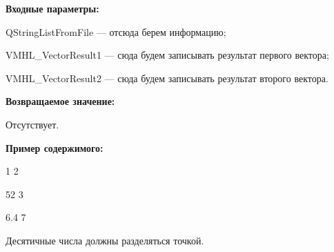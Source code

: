 \textbf{Входные параметры:}
 
QStringListFromFile --- отсюда берем информацию;
 
    VMHL\_VectorResult1 --- сюда будем записывать результат первого вектора;
 
    VMHL\_VectorResult2 --- сюда будем записывать результат второго вектора.

\textbf{Возвращаемое значение:}

Отсутствует.

\textbf{Пример содержимого:}

1	2

52	3

6.4	7

Десятичные числа должны разделяться точкой.